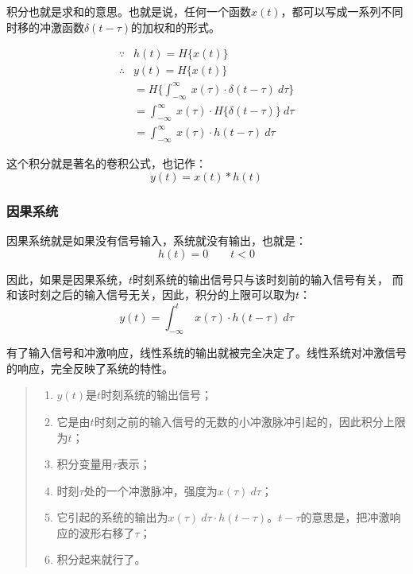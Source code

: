积分也就是求和的意思。也就是说，任何一个函数$x(t)$，都可以写成一系列不同时移的冲激函数$\delta(t-\tau)$的加权和的形式。

\begin{align*}
	\because   & h(t)=H\{x(t)\}                                                   \\
	\therefore & y(t)=H\{x(t)\}                                                   \\
	           & =H\{\int_{-\infty}^\infty\ x(\tau)\cdot \delta(t-\tau)\ d\tau \} \\
	           & =\int_{-\infty}^\infty\ x(\tau)\cdot H\{\delta(t-\tau)\}\ d\tau  \\
	           & =\int_{-\infty}^\infty\ x(\tau)\cdot h(t-\tau)\ d\tau
\end{align*}

这个积分就是著名的卷积公式，也记作：
\begin{equation}
	y(t)=x(t)*h(t)
\end{equation}
\subsubsection{因果系统}
因果系统就是如果没有信号输入，系统就没有输出，也就是：
\begin{equation}
	h(t)=0\qquad t<0
\end{equation}

因此，如果是因果系统，$t$时刻系统的输出信号只与该时刻前的输入信号有关，
而和该时刻之后的输入信号无关，因此，积分的上限可以取为$t$：
\begin{equation}
	y(t)=\int_{-\infty}^t\ x(\tau)\cdot h(t-\tau)\ d\tau
\end{equation}

有了输入信号和冲激响应，线性系统的输出就被完全决定了。线性系统对冲激信号的响应，完全反映了系统的特性。

\begin{quote}
	\begin{enumerate}
		\item $y(t)$是$t$时刻系统的输出信号；
		\item 它是由$t$时刻之前的输入信号的无数的小冲激脉冲引起的，因此积分上限为$t$；
		\item 积分变量用$\tau$表示；
		\item 时刻$\tau$处的一个冲激脉冲，强度为$x(\tau)\ d\tau$；
		\item 它引起的系统的输出为$x(\tau)\ d\tau\cdot h(t-\tau)$。$t-\tau$的意思是，把冲激响应的波形右移了$\tau$；
		\item 积分起来就行了。
	\end{enumerate}
\end{quote}
